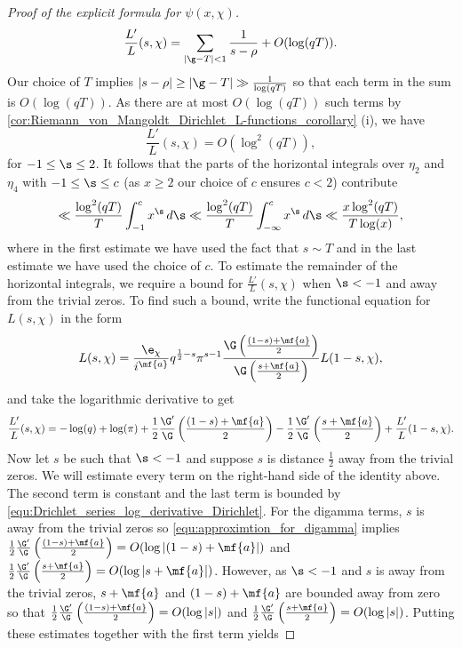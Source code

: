 \begin{proof}[Proof of the explicit formula for $\psi(x,\chi)$]
        \[
          \frac{L'}{L}(s,\chi) = \sum_{|\g-T| < 1}\frac{1}{s-\rho}+O(\log(qT)).
        \]
        Our choice of $T$ implies $|s-\rho| \ge |\g-T| \gg \frac{1}{\log(qT)}$ so that each term in the sum is $O(\log(qT))$. As there are at most $O(\log(qT))$ such terms by \cref{cor:Riemann_von_Mangoldt_Dirichlet_L-functions_corollary} (i), we have
        \[
          \frac{L'}{L}(s,\chi) = O(\log^{2}(qT)),
        \]
        for $-1 \le \s \le 2$. It follows that the parts of the horizontal integrals over $\eta_{2}$ and $\eta_{4}$ with  $-1 \le \s \le c$ (as $x \ge 2$ our choice of $c$ ensures $c < 2$) contribute
        \begin{equation}\label{equ:explicit_formula_Dirichlet_proof_8}
          \ll \frac{\log^{2}(qT)}{T}\int_{-1}^{c}x^{\s}\,d\s \ll \frac{\log^{2}(qT)}{T}\int_{-\infty}^{c}x^{\s}\,d\s \ll \frac{x\log^{2}(qT)}{T\log(x)},
        \end{equation}
        where in the first estimate we have used the fact that $s \sim T$ and in the last estimate we have used the choice of $c$. To estimate the remainder of the horizontal integrals, we require a bound for $\frac{L'}{L}(s,\chi)$ when $\s < -1$ and away from the trivial zeros. To find such a bound, write the functional equation for $L(s,\chi)$ in the form
        \[
          L(s,\chi) = \frac{\e_{\chi}}{i^{\mf{a}}}q^{\frac{1}{2}-s}\pi^{s-1}\frac{\G\left(\frac{(1-s)+\mf{a}}{2}\right)}{\G\left(\frac{s+\mf{a}}{2}\right)}L(1-s,\chi),
        \]
        and take the logarithmic derivative to get
        \[
          \frac{L'}{L}(s,\chi) = -\log(q)+\log(\pi)+\frac{1}{2}\frac{\G'}{\G}\left(\frac{(1-s)+\mf{a}}{2}\right)-\frac{1}{2}\frac{\G'}{\G}\left(\frac{s+\mf{a}}{2}\right)+\frac{L'}{L}(1-s,\chi).
        \]
        Now let $s$ be such that $\s < -1$ and suppose $s$ is distance $\frac{1}{2}$ away from the trivial zeros. We will estimate every term on the right-hand side of the identity above. The second term is constant and the last term is bounded by \cref{equ:Drichlet_series_log_derivative_Dirichlet}. For the digamma terms, $s$ is away from the trivial zeros so \cref{equ:approximtion_for_digamma} implies $\frac{1}{2}\frac{\G'}{\G}\left(\frac{(1-s)+\mf{a}}{2}\right) = O(\log|(1-s)+\mf{a}|)$ and $\frac{1}{2}\frac{\G'}{\G}\left(\frac{s+\mf{a}}{2}\right) = O(\log|s+\mf{a}|)$. However, as $\s < -1$ and $s$ is away from the trivial zeros, $s+\mf{a}$ and $(1-s)+\mf{a}$ are bounded away from zero so that $\frac{1}{2}\frac{\G'}{\G}\left(\frac{(1-s)+\mf{a}}{2}\right) = O(\log|s|)$ and $\frac{1}{2}\frac{\G'}{\G}\left(\frac{s+\mf{a}}{2}\right) = O(\log|s|)$. Putting these estimates together with the first term yields

\end{proof}
